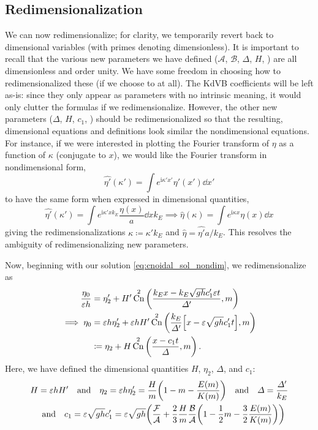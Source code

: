 \documentclass{jfm}
\let\Oldsubsection\subsection
\renewcommand{\subsection}{\FloatBarrier\Oldsubsection}
\DeclareMathOperator{\cn}{Cn}
\newcommand{\im}{\mathrm{i}}
\renewcommand*{\epsilon}{\varepsilon}
\begin{document}
\subsection{\label{sec:redim} Redimensionalization}
We can now redimensionalize; for clarity, we temporarily revert back to
dimensional variables (with primes denoting dimensionless).
It is important to recall that the various new parameters we have
defined ($\mathcal{A}$, $\mathcal{B}$, $\Delta$, $H$, \etc) are all
dimensionless and order unity.
We have some freedom in choosing how to redimensionalized these (if we
choose to at all).
The KdVB coefficients will be left as-is: since they only appear as
parameters with no intrinsic meaning, it would only clutter the formulas
if we redimensionalize.
However, the other new parameters ($\Delta$, $H$, $c_1$, \etc) should be
redimensionalized so that the resulting, dimensional equations and
definitions look similar the nondimensional equations.
For instance, if we were interested in plotting the Fourier transform of
$\eta$ as a function of $\kappa$ (conjugate to $x$), we would like the
Fourier transform in nondimensional form,
\[
  \hat{\eta'}(\kappa') = \int e^{\im \kappa' x'} \eta'(x') \dd{x'}
\]
to have the same form when expressed in dimensional quantities,
\[
  \hat{\eta'}(\kappa') = \int e^{\im \kappa' x k_E} \frac{\eta(x)}{a}
  \dd{x} k_E
  \implies \hat{\eta}(\kappa) = \int e^{\im \kappa x} \eta(x) \dd{x}
\]
giving the redimensionalizations  $\kappa \coloneqq \kappa' k_E$ and
$\hat{\eta} = \hat{\eta'} a/k_E$.
This resolves the ambiguity of redimensionalizing new parameters.

Now, beginning with our solution \cref{eq:cnoidal_sol_nondim}, we
redimensionalize as
\begin{equation}
  \begin{split}
  \frac{\eta_0}{\epsilon h} &= \eta_2' + H' \cn^2\pqty{\frac{k_E x - k_E
    \sqrt{gh} c_1' \epsilon t}{\Delta'}, m}
  \\
  \implies
  \eta_0 &= \epsilon h \eta_2' + \epsilon h H'
  \cn^2\pqty{\frac{k_E}{\Delta'} \bqty{x - \epsilon \sqrt{gh} c_1' t}, m}
  \\
  &\coloneqq \eta_2 + H \cn^2\pqty{\frac{x - c_1 t}{\Delta}, m} \,.
  \end{split}
\end{equation}
Here, we have defined the dimensional quantities $H$, $\eta_2$,
$\Delta$, and $c_1$:
\begin{gather}
  H = \epsilon h H'
  \qq{and}
  \eta_2 = \epsilon h \eta_2' = \frac{H}{m} \pqty{1 - m - \frac{E(m)}{K(m)}}
  \qq{and}
  \Delta = \frac{\Delta'}{k_E}
  \\
  \qq{and}
  c_1 = \epsilon \sqrt{gh} c_1' = \epsilon \sqrt{gh} \pqty{
    \frac{\mathcal{F}}{\mathcal{A}} + \frac{2}{3} \frac{H}{m}
    \frac{\mathcal{B}}{\mathcal{A}} \pqty{1 - \frac{1}{2} m - \frac{3}{2}
    \frac{E(m)}{K(m)}} }
\end{gather}
\end{document}
